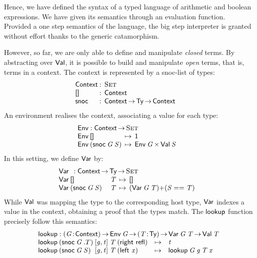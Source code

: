Hence, we have defined the syntax of a typed language of arithmetic
and boolean expressions. We have given its semantics through an
evaluation function. Provided a one step semantics of the language, the
big step interpreter is granted without effort thanks to the generic
catamorphism.

\newcommand{\Ctxt}{\D{Context}}
\newcommand{\SYMBCtxtEmpty}{\C{[]}\xspace}
\newcommand{\CtxtEmpty}{\SYMBCtxtEmpty}
\newcommand{\SYMBCtxtSnoc}{\C{snoc}\xspace}
\newcommand{\CtxtSnoc}[2]{\SYMBCtxtSnoc\:#1\:#2}
\newcommand{\SYMBEnv}{\F{Env}}
\newcommand{\Env}[1]{\SYMBEnv\: #1}
\newcommand{\SYMBlookup}{\F{lookup}}
\newcommand{\lookup}[4]{\SYMBlookup\: #1\: #2\: #3\: #4}

However, so far, we are only able to define and manipulate
\emph{closed} terms. By abstracting over $\SYMBVal$, it is possible to
build and manipulate \emph{open} terms, that is, terms in a
context. The context is represented by a snoc-list of types:
%
\[
\begin{array}{@{}l@{\::\:\:}l@{\quad}l}
\Ctxt           & \Set \\
\SYMBCtxtEmpty  & \Ctxt \\
\SYMBCtxtSnoc   & \Ctxt \To \Ty \To \Ctxt
\end{array}
\]
%
An environment realises the context, associating a value for each type:
%
\[
\stk{
\SYMBEnv : \Ctxt \To \Set \\
\begin{array}{@{}l@{\:\:\mapsto\:\:}l}
\Env{\CtxtEmpty}                & \Unit \\
\Env{(\CtxtSnoc{\V{G}}{\V{S}})} & \TIMES{\Env{\V{G}}}{\Val{\V{S}}}
\end{array}
}\]
%
In this setting, we define $\SYMBVar$ by:
%
\[\stk{
\Var{}{} : \Ctxt \To \Ty \To \Set \\
\begin{array}{@{}ll@{\:\:\mapsto\:\:}l}
\Var{\CtxtEmpty}{& \V{T}}                & 
    \Void \\
\Var{(\CtxtSnoc{\V{G}}{\V{S}})}{& \V{T}} & 
    \SUM{(\Var{\V{G}}{\V{T}})}{(\V{S} \PropEq \V{T})}
\end{array}
}\]
%
While $\SYMBVal$ was mapping the type to the corresponding host type,
$\SYMBVar$ indexes a value in the context, obtaining a proof that the
types match. The $\SYMBlookup$ function precisely follow this
semantics:
%
\[\stk{
\SYMBlookup : \PI{\V{G}}{\Ctxt} 
          \Env{\V{G}} \To 
          \PI{\V{T}}{\Ty} 
          \Var{\V{G}}{\V{T}} \To
          \Val{\V{T}} \\
\begin{array}{@{}l@{}l@{}l@{}l@{}lll}
\lookup{& (\CtxtSnoc{\V{G}}{.T})}{& \pair{\V{g}}{\V{t}}{}}{& \V{T}}{& (\SumRight{\C{refl}})} & \mapsto & \V{t} \\
\lookup{& (\CtxtSnoc{\V{G}}{\V{S}})}{& \pair{\V{g}}{\V{t}}{}}{& \V{T}}{& (\SumLeft{\V{x}})} & \mapsto & \lookup{\V{G}}{\V{g}}{\V{T}}{\V{x}} 
\end{array}
}\]

